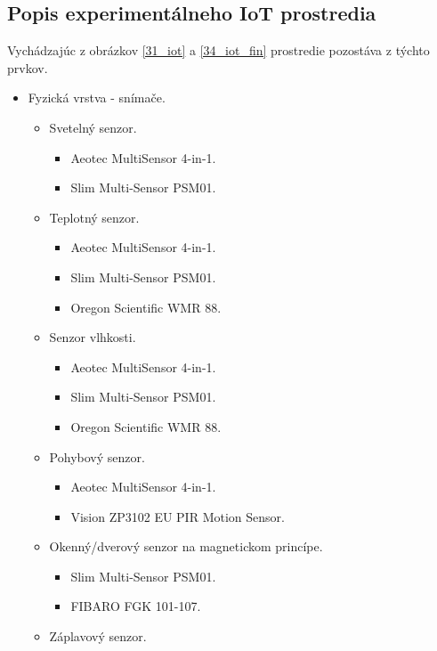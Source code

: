 \subsection{Popis experimentálneho IoT prostredia}
Vychádzajúc z obrázkov \ref{31_iot} a \ref{34_iot_fin} prostredie pozostáva z týchto prvkov.
\begin{itemize}
\item Fyzická vrstva - snímače.
  \begin{itemize}
    \item Svetelný senzor.
      \begin{itemize}
        \item Aeotec MultiSensor 4-in-1.
        \item Slim Multi-Sensor PSM01.        
       \end{itemize}
    \item Teplotný senzor.
      \begin{itemize}
        \item Aeotec MultiSensor 4-in-1.
        \item Slim Multi-Sensor PSM01.        
        \item Oregon Scientific WMR 88. 
       \end{itemize}    
    \item Senzor vlhkosti.
      \begin{itemize}
        \item Aeotec MultiSensor 4-in-1.
        \item Slim Multi-Sensor PSM01.        
        \item Oregon Scientific WMR 88. 
       \end{itemize}     
    \item Pohybový senzor.
      \begin{itemize}
        \item Aeotec MultiSensor 4-in-1.
        \item Vision ZP3102 EU PIR Motion Sensor.        
       \end{itemize}     
    \item Okenný/dverový senzor na magnetickom princípe.
      \begin{itemize}
        \item Slim Multi-Sensor PSM01.
        \item FIBARO FGK 101-107.        
       \end{itemize}            
    \item Záplavový senzor.    
      \begin{itemize}

\end{itemize}
\end{itemize}
\end{itemize}
